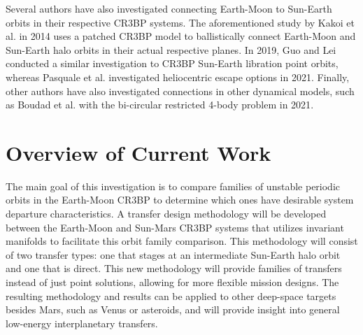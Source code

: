 Several authors have also investigated connecting Earth-Moon to Sun-Earth orbits in their
respective CR3BP systems. The aforementioned study by Kakoi et al. in 2014 uses a patched CR3BP
model to ballistically connect Earth-Moon and Sun-Earth halo orbits in their actual respective
planes\cite{Kakoi:2014}. In 2019, Guo and Lei conducted a similar investigation to CR3BP Sun-Earth
libration point orbits\cite{Guo:2019}, whereas Pasquale et al. investigated heliocentric escape
options in 2021\cite{Pasquale:2021}. Finally, other authors have also investigated connections in
other dynamical models, such as Boudad et al. with the bi-circular restricted 4-body problem in
2021\cite{Boudad:2021}.

\section{Overview of Current Work}
The main goal of this investigation is to compare families of unstable periodic orbits in the
Earth-Moon CR3BP to determine which ones have desirable system departure characteristics. A
transfer design methodology will be developed between the Earth-Moon and Sun-Mars CR3BP systems
that utilizes invariant manifolds to facilitate this orbit family comparison. This methodology will
consist of two transfer types: one that stages at an intermediate Sun-Earth halo orbit and one that
is direct. This new methodology will provide families of transfers instead of just point solutions,
allowing for more flexible mission designs. The resulting methodology and results can be applied to
other deep-space targets besides Mars, such as Venus or asteroids, and will provide insight into
general low-energy interplanetary transfers.

